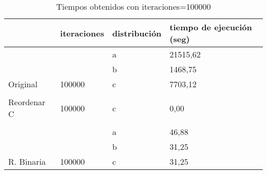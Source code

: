 \documentclass{article}
\begin{document}
	\newpage

	\begin{table}[h]
		\begin{tabular}{llll}
			\hline
			\rowcolor[HTML]{F8A102} 
			\multicolumn{1}{|l|}{\cellcolor[HTML]{F8A102}modificación} & \multicolumn{1}{l|}{\cellcolor[HTML]{F8A102}iteraciones} & \multicolumn{1}{l|}{\cellcolor[HTML]{F8A102}distribución} & \multicolumn{1}{l|}{\cellcolor[HTML]{F8A102}tiempo de ejecución (seg)} \\ \hline
			\multicolumn{1}{|l|}{}                                     & \multicolumn{1}{l|}{}                                    & \multicolumn{1}{l|}{a}                                    & \multicolumn{1}{l|}{21515,62}                                    \\ \cline{3-4} 
			\multicolumn{1}{|l|}{}                                     & \multicolumn{1}{l|}{}                                    & \multicolumn{1}{l|}{b}                                    & \multicolumn{1}{l|}{1468,75}                                     \\ \cline{3-4} 
			\multicolumn{1}{|l|}{\multirow{-3}{*}{Original}}           & \multicolumn{1}{l|}{\multirow{-3}{*}{100000}}            & \multicolumn{1}{l|}{c}                                    & \multicolumn{1}{l|}{7703,12}                                     \\ \hline
			&                                                          &                                                           &                                                                  \\ \hline
			\multicolumn{1}{|l|}{Reordenar C}                          & \multicolumn{1}{l|}{100000}                              & \multicolumn{1}{l|}{c}                                    & \multicolumn{1}{l|}{0,00}                                        \\ \hline
			&                                                          &                                                           &                                                                  \\ \hline
			\multicolumn{1}{|l|}{}                                     & \multicolumn{1}{l|}{}                                    & \multicolumn{1}{l|}{a}                                    & \multicolumn{1}{l|}{46,88}                                       \\ \cline{3-4} 
			\multicolumn{1}{|l|}{}                                     & \multicolumn{1}{l|}{}                                    & \multicolumn{1}{l|}{b}                                    & \multicolumn{1}{l|}{31,25}                                       \\ \cline{3-4} 
			\multicolumn{1}{|l|}{\multirow{-3}{*}{R. Binaria}}         & \multicolumn{1}{l|}{\multirow{-3}{*}{100000}}            & \multicolumn{1}{l|}{c}                                    & \multicolumn{1}{l|}{31,25}                                       \\ \hline
		\end{tabular}
	\caption{Tiempos obtenidos con iteraciones=100000}
	\end{table}
\end{document}
